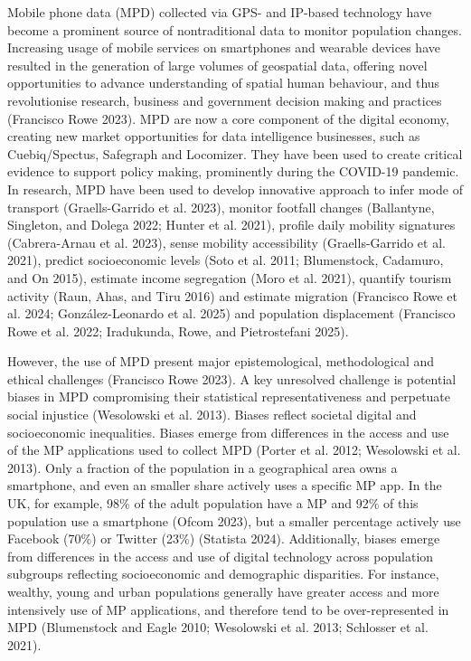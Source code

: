 \documentclass{article}
\begin{document}
Mobile phone data (MPD) collected via GPS- and IP-based technology have
become a prominent source of nontraditional data to monitor population
changes. Increasing usage of mobile services on smartphones and wearable
devices have resulted in the generation of large volumes of geospatial
data, offering novel opportunities to advance understanding of spatial
human behaviour, and thus revolutionise research, business and
government decision making and practices (Francisco Rowe 2023). MPD are now
a core component of the digital economy, creating new market
opportunities for data intelligence businesses, such as Cuebiq/Spectus,
Safegraph and Locomizer. They have been used to create critical evidence
to support policy making, prominently during the COVID-19 pandemic. In
research, MPD have been used to develop innovative approach to infer
mode of transport (Graells-Garrido et al. 2023), monitor footfall changes
(Ballantyne, Singleton, and Dolega 2022; Hunter et al. 2021), profile daily mobility signatures
(Cabrera-Arnau et al. 2023), sense mobility accessibility
(Graells-Garrido et al. 2021), predict socioeconomic levels (Soto et al. 2011; Blumenstock, Cadamuro, and On 2015), estimate income segregation (Moro et al. 2021), quantify
tourism activity (Raun, Ahas, and Tiru 2016) and estimate migration (Francisco Rowe et al. 2024; González-Leonardo et al. 2025) and population displacement (Francisco Rowe et al. 2022; Iradukunda, Rowe, and Pietrostefani 2025).

However, the use of MPD present major epistemological, methodological
and ethical challenges (Francisco Rowe 2023). A key unresolved challenge is
potential biases in MPD compromising their statistical
representativeness and perpetuate social injustice
(Wesolowski et al. 2013). Biases reflect societal digital and
socioeconomic inequalities. Biases emerge from differences in the access
and use of the MP applications used to collect MPD
(Porter et al. 2012; Wesolowski et al. 2013). Only a fraction of the population
in a geographical area owns a smartphone, and even an smaller share
actively uses a specific MP app. In the UK, for example, 98\%
of the adult population have a MP and 92\% of this population
use a smartphone (Ofcom 2023), but a smaller percentage actively use
Facebook (70\%) or Twitter (23\%) (Statista 2024). Additionally, biases
emerge from differences in the access and use of digital technology
across population subgroups reflecting socioeconomic and demographic
disparities. For instance, wealthy, young and urban populations
generally have greater access and more intensively use of MP
applications, and therefore tend to be over-represented in MPD
(Blumenstock and Eagle 2010; Wesolowski et al. 2013; Schlosser et al. 2021).
\end{document}
